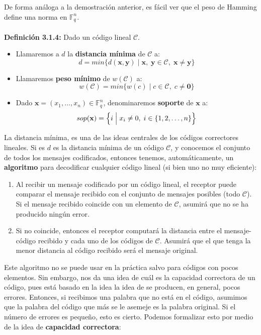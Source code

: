 \documentclass[11pt,spanish]{book}
\begin{document}
De forma análoga a la demostración anterior, es fácil ver que el peso de Hamming define una norma en $\mathbb{F}_{q}^{n}$.\\
\\ \hypertarget{def3.14}{\textbf{Definición 3.1.4: }} Dado un código lineal $\mathcal{C}$.
\begin{itemize}
\item Llamaremos a $d$ la \textbf{distancia mínima} de $\mathcal{C}$ a: $$d=min\{d(\textbf{x},\textbf{y})\;|\;\textbf{x},\;\textbf{y}\in\mathcal{C},\;\textbf{x}\neq\textbf{y}\}$$
\item Llamaremos \textbf{peso mínimo} de $w(\mathcal{C})$ a:
$$w(\mathcal{C})=min\{w(c)\;|\;c\in \mathcal{C},\; c\neq \mathbf{0}\}$$
\item Dado $\textbf{x}=(x_{1},\ldots,x_{n})\in \mathbb{F}_{q}^{n}$, denominaremos \hypertarget{soporte}{\textbf{soporte}} de $\mathbf{x}$ a:
$$sop(\mathbf{x})=\Big{\{}i\;\Big{|}\; x_{i}\neq 0,\; i\in \{1,2,\ldots, n\}\Big{\}}$$
\end{itemize}

La distancia mínima, es una de las ideas centrales de los códigos correctores lineales. Si es $d$ es la distancia mínima de un código $\mathcal{C}$, y conocemos el conjunto de todos los mensajes codificados, entonces tenemos, automáticamente, un \hypertarget{algoritmo}{\textbf{algoritmo}}  para decodificar cualquier código lineal (si bien uno no muy eficiente):
\begin{enumerate}
    \item Al recibir un mensaje codificado por un código lineal, el receptor puede comparar el mensaje recibido con el conjunto de mensajes posibles (todo $\mathcal{C}$). Si el mensaje recibido coincide con un elemento de $\mathcal{C}$, asumirá que no se ha producido ningún error.
    \item Si no coincide, entonces el receptor computará la distancia entre el mensaje-código recibido y cada uno de los códigos de $\mathcal{C}$. Asumirá que el que tenga la menor distancia al código recibido será el mensaje original. 
   
\end{enumerate}

Este algoritmo no se puede usar en la práctica salvo para códigos con pocos elementos. Sin embargo, nos da una idea de cuál es la capacidad correctora de un código, pues está basado en la idea la idea de se producen, en general, pocos errores. Entonces, si recibimos una palabra que no está en el código, asumimos que la palabra del código que más se le asemeje es la palabra original. Si el número de errores es pequeño, esto es cierto. Podemos formalizar esto por medio de la idea de \textbf{capacidad correctora}:\\
\end{document}

